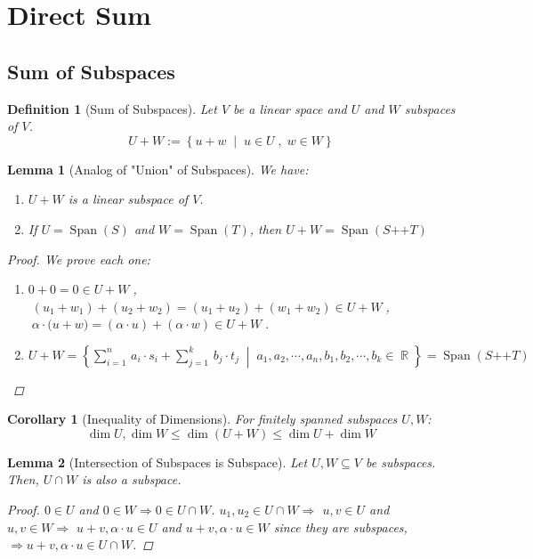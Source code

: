 \documentclass[12pt]{article}
\let\RA\Rightarrow
\newcommand{\set}[2]{\left\{{#1}\;\middle|\;{#2}\right\}}
\DeclareMathOperator{\R}{\mathbb{R}}
\DeclareMathOperator{\Span}{Span}
\DeclareMathOperator{\concat}{++}
\newtheorem{definition}{Definition}[subsection]
\newtheorem{lemma}{Lemma}[subsection]
\newtheorem{corollary}{Corollary}[subsection]
\begin{document}
\pagebreak

\section{Direct Sum}

\subsection{Sum of Subspaces}

\begin{definition}[Sum of Subspaces]
  Let $V$ be a linear space and $U$ and $W$ subspaces of $V$.
  $$U+W:=\set{u+w}{u\in U\;,\;w\in W}$$
\end{definition}

\begin{lemma}[Analog of "Union" of Subspaces]
  We have:
  \begin{enumerate}
    \item $U+W$ is a linear subspace of $V$.
    \item If $U=\Span(S)$ and $W=\Span(T)$, then $U+W=\Span(S\concat T)$
  \end{enumerate}
  \begin{proof}
    We prove each one:
    \begin{enumerate}
      \item $0+0=0\in U+W\;$, $\;(u_1+w_1)+(u_2+w_2)=(u_1+u_2)+(w_1+w_2)\in U+W\;$, $\;\alpha\cdot\big(u+w\big)=(\alpha\cdot u)+(\alpha\cdot w)\in U+W\;$.
      \item $\displaystyle U+W=\set{\sum_{i=1}^n\,a_i\cdot s_i+\sum_{j=1}^k\,b_j\cdot t_j}{a_1,a_2,\cdots,a_n,b_1,b_2,\cdots,b_k\in \R}=\Span(S\concat T)$
    \end{enumerate}
  \end{proof}
\end{lemma}

\begin{corollary}[Inequality of Dimensions]
  For finitely spanned subspaces $U,W$: $$\dim U,\dim W\leq \dim(U+W)\leq \dim U+\dim W$$
\end{corollary}

\begin{lemma}[Intersection of Subspaces is Subspace]
  Let $U,W\subseteq V$ be subspaces. Then, $U\cap W$ is also a subspace.
  \begin{proof}
    $0\in U$ and $0\in W\RA 0\in U\cap W$. $u_1,u_2\in U\cap W\RA$ $u,v\in U$ and $u,v\in W\RA$ $u+v,\alpha\cdot u\in U$ and $u+v,\alpha\cdot u\in W$ since they are subspaces, $\RA u+v,\alpha\cdot u\in U\cap W$.
  \end{proof} 
\end{lemma}
\end{document}
